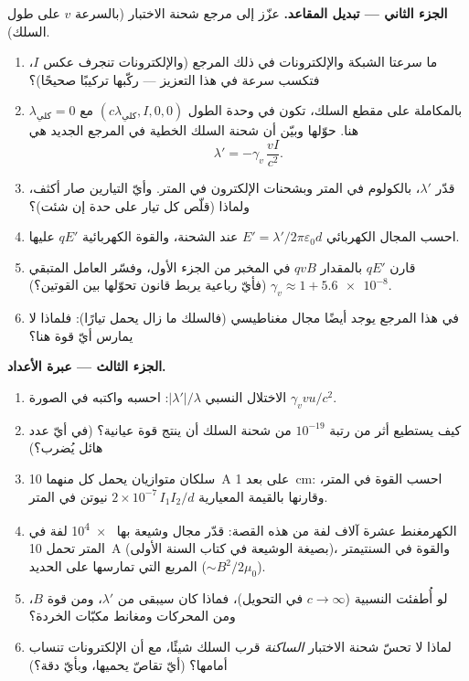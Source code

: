 \begin{problem}
\medskip\noindent\textbf{الجزء الثاني --- تبديل المقاعد.}
عزّز إلى مرجع شحنة الاختبار (بالسرعة $v$ على طول السلك).
\begin{enumerate}[resume]
  \item ما سرعتا الشبكة والإلكترونات في ذلك المرجع
        (والإلكترونات تنجرف عكس $I$، فتكسب سرعة
        في هذا التعزيز --- ركّبها تركيبًا صحيحًا)؟
  \item بالمكاملة على مقطع السلك، تكون  في
        وحدة الطول $(c\lambda_{\text{كلي}}, I, 0, 0)$ مع
        $\lambda_{\text{كلي}} = 0$ هنا. حوّلها وبيّن أن شحنة
        السلك الخطية في المرجع الجديد هي
        \[
        \lambda' = -\gamma_v\,\frac{vI}{c^2} .
        \]
  \item قدّر $\lambda'$، بالكولوم في المتر وبشحنات
        الإلكترون في المتر. وأيّ التيارين صار أكثف، ولماذا
        (قلّص كل تيار على حدة إن شئت)؟
  \item احسب المجال الكهربائي $E' = \lambda'/2\pi\varepsilon_0d$
        عند الشحنة، والقوة الكهربائية $qE'$ عليها.
  \item قارن $qE'$ بالمقدار $qvB$ في المخبر من الجزء الأول، وفسّر
        العامل المتبقي $\gamma_v \approx 1 + \num{5.6e-8}$
        (فأيّ رباعية يربط قانون تحوّلها بين القوتين؟).
  \item في هذا المرجع يوجد أيضًا مجال مغناطيسي (فالسلك ما زال
        يحمل تيارًا): فلماذا لا يمارس أيّ قوة هنا؟
\end{enumerate}

\medskip\noindent\textbf{الجزء الثالث --- عبرة الأعداد.}
\begin{enumerate}[resume]
  \item الاختلال النسبي $|\lambda'|/\lambda$: احسبه
        واكتبه في الصورة $\gamma_v vu/c^2$.
  \item كيف يستطيع أثر من رتبة $10^{-19}$ من شحنة السلك أن
        ينتج قوة عيانية؟ (في أيّ عدد هائل يُضرب؟)
  \item سلكان متوازيان يحمل كل منهما \qty{10}{A} على بعد \qty{1}{cm}:
        احسب القوة في المتر، وقارنها بالقيمة
        المعيارية $2 \times 10^{-7}\,I_1I_2/d$ نيوتن
        في المتر.
  \item الكهرمغنط عشرة آلاف لفة من هذه القصة:
        قدّر مجال وشيعة بها \qty{e4}{} لفة في المتر
        تحمل \qty{10}{A} (بصيغة الوشيعة في كتاب السنة
        الأولى)، والقوة في السنتيمتر المربع التي تمارسها على
        الحديد ($\sim B^2/2\mu_0$).
  \item لو أُطفئت النسبية ($c \to \infty$ في
        التحويل)، فماذا كان سيبقى من $\lambda'$، ومن قوة $B$،
        ومن المحركات ومغانط مكبّات الخردة؟
  \item لماذا لا تحسّ شحنة الاختبار \emph{الساكنة} قرب السلك
        شيئًا، مع أن الإلكترونات تنساب أمامها؟ (أيّ
        تقاصّ يحميها، وبأيّ دقة؟)
\end{enumerate}


\end{problem}
